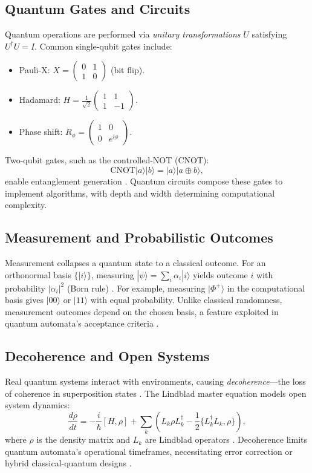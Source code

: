 \subsection{Quantum Gates and Circuits}
\label{subsec:gates}

Quantum operations are performed via \textit{unitary transformations} $U$ satisfying $U^\dagger U = I$. Common single-qubit gates include:
\begin{itemize}
    \item Pauli-X: $X = \begin{pmatrix} 0 & 1 \\ 1 & 0 \end{pmatrix}$ (bit flip).
    \item Hadamard: $H = \frac{1}{\sqrt{2}}\begin{pmatrix} 1 & 1 \\ 1 & -1 \end{pmatrix}$.
    \item Phase shift: $R_\phi = \begin{pmatrix} 1 & 0 \\ 0 & e^{i\phi} \end{pmatrix}$.
\end{itemize}
Two-qubit gates, such as the controlled-NOT (CNOT):
\[
\text{CNOT}|a\rangle|b\rangle = |a\rangle|a \oplus b\rangle,
\]
enable entanglement generation \cite{nielsen2010quantum}. Quantum circuits compose these gates to implement algorithms, with depth and width determining computational complexity.

\subsection{Measurement and Probabilistic Outcomes}
\label{subsec:measurement}

Measurement collapses a quantum state to a classical outcome. For an orthonormal basis $\{|i\rangle\}$, measuring $|\psi\rangle = \sum_i \alpha_i|i\rangle$ yields outcome $i$ with probability $|\alpha_i|^2$ (Born rule) \cite{nielsen2010quantum}. For example, measuring $|\Phi^+\rangle$ in the computational basis gives $|00\rangle$ or $|11\rangle$ with equal probability. Unlike classical randomness, measurement outcomes depend on the chosen basis, a feature exploited in quantum automata's acceptance criteria \cite{moore2000quantum}.

\subsection{Decoherence and Open Systems}
\label{subsec:decoherence}

Real quantum systems interact with environments, causing \textit{decoherence}—the loss of coherence in superposition states \cite{breuer2002theory}. The Lindblad master equation models open system dynamics:
\[
\frac{d\rho}{dt} = -\frac{i}{\hbar}[H, \rho] + \sum_k \left( L_k \rho L_k^\dagger - \frac{1}{2}\{L_k^\dagger L_k, \rho\} \right),
\]
where $\rho$ is the density matrix and $L_k$ are Lindblad operators \cite{breuer2002theory}. Decoherence limits quantum automata's operational timeframes, necessitating error correction or hybrid classical-quantum designs \cite{zheng2012one}.